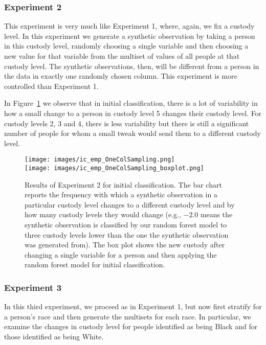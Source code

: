 \documentclass{amsproc}
\numberwithin{equation}{section}
\theoremstyle{plain}
\theoremstyle{remark}
\begin{document}
\subsubsection{Experiment 2} This experiment is very much like Experiment 1, where, again, we fix a custody level.  In this experiment we generate a synthetic observation by taking a person in this custody level, randomly choosing a single variable and then choosing a new value for that variable from the multiset of values of all people at that custody level.  The synthetic observations, then, will be different from a person in the data in exactly one randomly chosen column.  This experiment is more controlled than Experiment 1.

In Figure~\ref{fig:one-col-by-CL} we observe that in initial classification, there is a lot of variability in how a small change to a person in custody level 5 changes their custody level.  For custody levels 2, 3 and 4, there is less variability but there is still a significant number of people for whom a small tweak would send them to a different custody level.

\begin{figure}
\centering
\texttt{[image: images/ic\_emp\_OneColSampling.png]}
\\
\texttt{[image: images/ic\_emp\_OneColSampling\_boxplot.png]}
\caption{Results of Experiment 2 for initial classification.  The bar chart reports the frequency with which a synthetic observation in a particular custody level changes to a different custody level and by how many custody levels they would change (e.g., $-2.0$ means the synthetic observation is classified by our random forest model to three custody levels lower than the one the synthetic observation was generated from).  The box plot shows the new custody after changing a single variable for a person and then applying the random forest model for initial classification.}\label{fig:one-col-by-CL}
\end{figure}

\subsubsection{Experiment 3}  In this third experiment, we proceed as in Experiment 1, but now first stratify for a person's race and then generate the multisets for each race.  In particular, we examine the changes in custody level for people identified as being Black and for those identified as being White.
\end{document}
